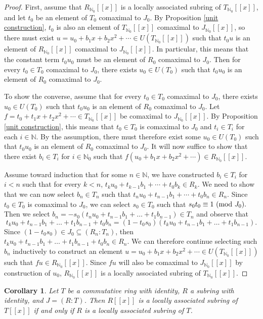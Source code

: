 \documentclass[12pt]{amsart}
\newtheorem{corollary}[theorem]{Corollary}
\theoremstyle{definition}
\newcommand{\bN}{\mathbb N}
\newcommand{\bNo}{{{\mathbb N}_0}}
\newcommand{\modulo}[1]{\textup{ (mod }#1)}
\begin{document}
\begin{proof}
    First, assume that $R_\bNo[[x]]$ is a locally associated subring of $T_\bNo[[x]]$, and let $t_0$ be an element of $T_0$ comaximal to $J_0$. By Proposition \ref{unit construction}, $t_0$ is also an element of $T_\bNo[[x]]$ comaximal to $J_\bNo[[x]]$, so there must exist $u=u_0+b_1x+b_2x^2+\cdots\in U(T_\bNo[[x]])$ such that $t_0u$ is an element of $R_\bNo[[x]]$ comaximal to $J_\bNo[[x]]$. In particular, this means that the constant term $t_0u_0$ must be an element of $R_0$ comaximal to $J_0$. Then for every $t_0\in T_0$ comaximal to $J_0$, there exists $u_0\in U(T_0)$ such that $t_0u_0$ is an element of $R_0$ comaximal to $J_0$.

    To show the converse, assume that for every $t_0\in T_0$ comaximal to $J_0$, there exists $u_0\in U(T_0)$ such that $t_0u_0$ is an element of $R_0$ comaximal to $J_0$. Let $f=t_0+t_1x+t_2x^2+\cdots\in T_\bNo[[x]]$ be comaximal to $J_\bNo[[x]]$. By Proposition \ref{unit construction}, this means that $t_0\in T_0$ is comaximal to $J_0$ and $t_i\in T_i$ for each $i\in\bN$. By the assumption, there must therefore exist some $u_0\in U(T_0)$ such that $t_0u_0$ is an element of $R_0$ comaximal to $J_0$. It will now suffice to show that there exist $b_i\in T_i$ for $i\in\bNo$ such that $f(u_0+b_1x+b_2x^2+\cdots)\in R_\bNo[[x]]$.

    Assume toward induction that for some $n\in\bN$, we have constructed $b_i\in T_i$ for $i<n$ such that for every $k<n$, $t_ku_0+t_{k-1}b_1+\cdots+t_0b_k\in R_k$. We need to show that we can now select $b_n\in T_n$ such that $t_nu_0+t_{n-1}b_1+\cdots+t_0b_n\in R_n$. Since $t_0\in T_0$ is comaximal to $J_0$, we can select $s_0\in T_0$ such that $s_0t_0\equiv 1\modulo{J_0}.$ Then we select $b_n=-s_0(t_nu_0+t_{n-1}b_1+\dots+t_1b_{n-1})\in T_n$ and observe that
    $$t_ku_0+t_{n-1}b_1+\dots+t_1b_{n-1}+t_0b_n=(1-t_0s_0)(t_ku_0+t_{n-1}b_1+\dots+t_1b_{n-1}).$$
    Since $(1-t_0s_0)\in J_0\subseteq (R_n:T_n)$, then $t_ku_0+t_{n-1}b_1+\dots+t_1b_{n-1}+t_0b_n\in R_n$. We can therefore continue selecting such $b_n$ inductively to construct an element $u=u_0+b_1x+b_2x^2+\cdots\in U(T_\bNo[[x]])$ such that $fu\in R_\bNo[[x]]$. Since $fu$ will also be comaximal to $J_\bNo[[x]]$ by construction of $u_0$, $R_\bNo[[x]]$ is a locally associated subring of $T_\bNo[[x]]$.
\end{proof}

\begin{corollary}
    Let $T$ be a commutative ring with identity, $R$ a subring with identity, and $J=(R:T)$. Then $R[[x]]$ is a locally associated subring of $T[[x]]$ if and only if $R$ is a locally associated subring of $T$.
\end{corollary}
\end{document}
